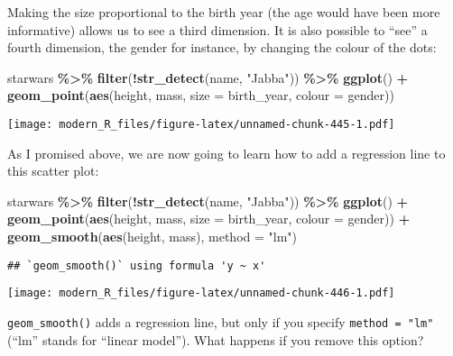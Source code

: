 \documentclass[
]{article}
\newenvironment{Shaded}{\begin{snugshade}}{\end{snugshade}}
\newcommand{\DataTypeTok}[1]{\textcolor[rgb]{0.13,0.29,0.53}{#1}}
\newcommand{\KeywordTok}[1]{\textcolor[rgb]{0.13,0.29,0.53}{\textbf{#1}}}
\newcommand{\NormalTok}[1]{#1}
\newcommand{\OperatorTok}[1]{\textcolor[rgb]{0.81,0.36,0.00}{\textbf{#1}}}
\newcommand{\StringTok}[1]{\textcolor[rgb]{0.31,0.60,0.02}{#1}}
\begin{document}
Making the size proportional to the birth year (the age would have been more informative) allows
us to see a third dimension. It is also possible to ``see'' a fourth dimension, the gender for instance,
by changing the colour of the dots:

\begin{Shaded}
\begin{Highlighting}[]
\NormalTok{starwars }\OperatorTok{\%\textgreater{}\%}
\StringTok{  }\KeywordTok{filter}\NormalTok{(}\OperatorTok{!}\KeywordTok{str\_detect}\NormalTok{(name, }\StringTok{"Jabba"}\NormalTok{)) }\OperatorTok{\%\textgreater{}\%}
\StringTok{  }\KeywordTok{ggplot}\NormalTok{() }\OperatorTok{+}
\StringTok{    }\KeywordTok{geom\_point}\NormalTok{(}\KeywordTok{aes}\NormalTok{(height, mass, }\DataTypeTok{size =}\NormalTok{ birth\_year, }\DataTypeTok{colour =}\NormalTok{ gender))}
\end{Highlighting}
\end{Shaded}

\texttt{[image: modern\_R\_files/figure-latex/unnamed-chunk-445-1.pdf]}

As I promised above, we are now going to learn how to add a regression line to this scatter plot:

\begin{Shaded}
\begin{Highlighting}[]
\NormalTok{starwars }\OperatorTok{\%\textgreater{}\%}
\StringTok{  }\KeywordTok{filter}\NormalTok{(}\OperatorTok{!}\KeywordTok{str\_detect}\NormalTok{(name, }\StringTok{"Jabba"}\NormalTok{)) }\OperatorTok{\%\textgreater{}\%}
\StringTok{  }\KeywordTok{ggplot}\NormalTok{() }\OperatorTok{+}
\StringTok{    }\KeywordTok{geom\_point}\NormalTok{(}\KeywordTok{aes}\NormalTok{(height, mass, }\DataTypeTok{size =}\NormalTok{ birth\_year, }\DataTypeTok{colour =}\NormalTok{ gender)) }\OperatorTok{+}
\StringTok{    }\KeywordTok{geom\_smooth}\NormalTok{(}\KeywordTok{aes}\NormalTok{(height, mass), }\DataTypeTok{method  =} \StringTok{"lm"}\NormalTok{)}
\end{Highlighting}
\end{Shaded}

\begin{verbatim}
## `geom_smooth()` using formula 'y ~ x'
\end{verbatim}

\texttt{[image: modern\_R\_files/figure-latex/unnamed-chunk-446-1.pdf]}

\texttt{geom\_smooth()} adds a regression line, but only if you specify \texttt{method\ =\ "lm"} (``lm'' stands for
``linear model''). What happens if you remove this option?
\end{document}
